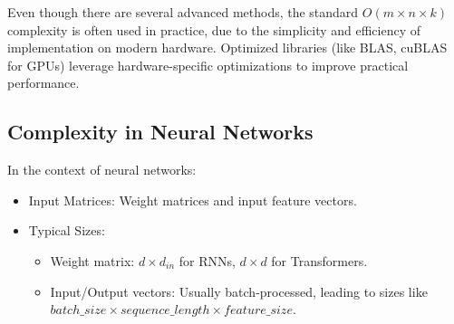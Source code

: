 Even though there are several advanced methods, the standard \(O(m \times n \times k)\) complexity is often used in practice, due to the simplicity and efficiency of implementation on modern hardware. Optimized libraries (like BLAS, cuBLAS for GPUs) leverage hardware-specific optimizations to improve practical performance.

\subsection{Complexity in Neural Networks}

In the context of neural networks:
\begin{itemize}
	\item Input Matrices: Weight matrices and input feature vectors.
	\item Typical Sizes:
		\begin{itemize}
			\item Weight matrix: \(d \times d_{in}\) for RNNs, \(d \times d\) for Transformers.
			\item Input/Output vectors: Usually batch-processed, leading to sizes like \(batch\_size \times sequence\_length \times feature\_size\).
		\end{itemize}
\end{itemize}




